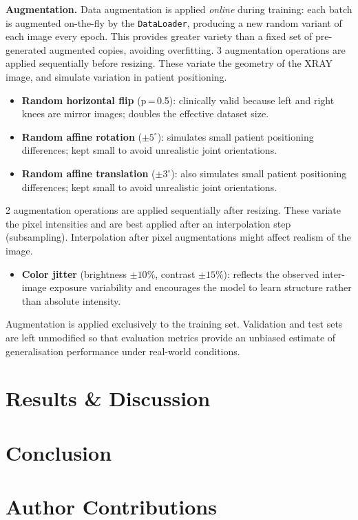 \documentclass[conference]{IEEEtran}
\begin{document}
\textbf{Augmentation.}
Data augmentation is applied \emph{online} during training: each batch is augmented
on-the-fly by the \texttt{DataLoader}, producing a new random variant of each image
every epoch. This provides greater variety than a fixed set of pre-generated augmented
copies, avoiding overfitting.
3 augmentation operations are applied sequentially before resizing. These variate the
geometry of the XRAY image, and simulate variation in patient positioning.
\begin{itemize}
  \item \textbf{Random horizontal flip} (p\,=\,0.5): clinically valid because left and
        right knees are mirror images; doubles the effective dataset size.
  \item \textbf{Random affine rotation} ($\pm 5^\circ$): simulates small patient
        positioning differences; kept small to avoid unrealistic joint orientations.
  \item \textbf{Random affine translation} ($\pm 3^\circ$): also simulates small patient
        positioning differences; kept small to avoid unrealistic joint orientations.
\end{itemize}
2 augmentation operations are applied sequentially after resizing. These variate the
pixel intensities and are best applied after an interpolation step (subsampling).
Interpolation after pixel augmentations might affect realism of the image.
\begin{itemize}
  \item \textbf{Color jitter} (brightness $\pm 10\%$, contrast $\pm 15\%$): reflects
        the observed inter-image exposure variability and encourages the model to learn
        structure rather than absolute intensity.
\end{itemize}
Augmentation is applied exclusively to the training set.
Validation and test sets are left unmodified so that evaluation metrics provide an
unbiased estimate of generalisation performance under real-world conditions.

\section{Results \& Discussion}

\section{Conclusion}

\section{Author Contributions}
\end{document}

